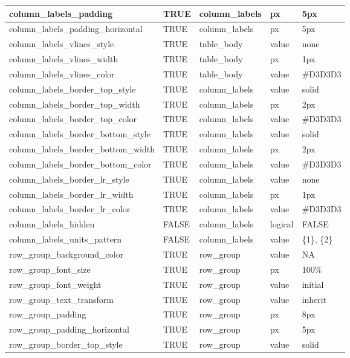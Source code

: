 \documentclass[
  letterpaper,
  DIV=11,
  numbers=noendperiod]{scrartcl}
\begin{document}
\begin{table}
{\begin{tabular}[t]{l|l|l|l|l}
\hline
column\_labels\_padding & TRUE & column\_labels & px & 5px\\
\hline
column\_labels\_padding\_horizontal & TRUE & column\_labels & px & 5px\\
\hline
column\_labels\_vlines\_style & TRUE & table\_body & value & none\\
\hline
column\_labels\_vlines\_width & TRUE & table\_body & px & 1px\\
\hline
column\_labels\_vlines\_color & TRUE & table\_body & value & \#D3D3D3\\
\hline
column\_labels\_border\_top\_style & TRUE & column\_labels & value & solid\\
\hline
column\_labels\_border\_top\_width & TRUE & column\_labels & px & 2px\\
\hline
column\_labels\_border\_top\_color & TRUE & column\_labels & value & \#D3D3D3\\
\hline
column\_labels\_border\_bottom\_style & TRUE & column\_labels & value & solid\\
\hline
column\_labels\_border\_bottom\_width & TRUE & column\_labels & px & 2px\\
\hline
column\_labels\_border\_bottom\_color & TRUE & column\_labels & value & \#D3D3D3\\
\hline
column\_labels\_border\_lr\_style & TRUE & column\_labels & value & none\\
\hline
column\_labels\_border\_lr\_width & TRUE & column\_labels & px & 1px\\
\hline
column\_labels\_border\_lr\_color & TRUE & column\_labels & value & \#D3D3D3\\
\hline
column\_labels\_hidden & FALSE & column\_labels & logical & FALSE\\
\hline
column\_labels\_units\_pattern & FALSE & column\_labels & value & \{1\}, \{2\}\\
\hline
row\_group\_background\_color & TRUE & row\_group & value & NA\\
\hline
row\_group\_font\_size & TRUE & row\_group & px & 100\%\\
\hline
row\_group\_font\_weight & TRUE & row\_group & value & initial\\
\hline
row\_group\_text\_transform & TRUE & row\_group & value & inherit\\
\hline
row\_group\_padding & TRUE & row\_group & px & 8px\\
\hline
row\_group\_padding\_horizontal & TRUE & row\_group & px & 5px\\
\hline
row\_group\_border\_top\_style & TRUE & row\_group & value & solid\\

\end{tabular}}
\end{table}
\end{document}
